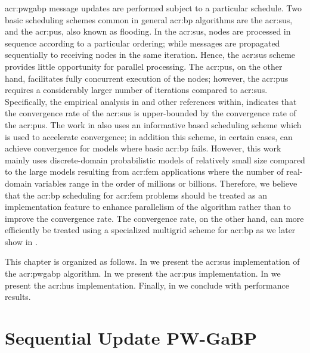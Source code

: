 \gls{acr:pwgabp} message updates are performed subject to a particular schedule.
Two basic scheduling schemes common in general \gls{acr:bp} algorithms are the \gls{acr:sus}, and the \gls{acr:pus}, also known as flooding.  
In the \gls{acr:sus}, nodes are processed in sequence according to a particular ordering; while messages are propagated sequentially to receiving nodes in the same iteration.  
Hence, the \gls{acr:sus} scheme provides little opportunity for parallel processing.
The \gls{acr:pus}, on the other hand, facilitates fully concurrent execution of the nodes; however, the \gls{acr:pus} requires a considerably larger number of iterations compared to \gls{acr:sus}.
Specifically, the empirical analysis in \cite{bib:Elidan06ResidualBP,bib:Bertsekas1983DACFP} and other references within, indicates that the convergence rate of the \gls{acr:sus} is upper-bounded by the convergence rate of the \gls{acr:pus}.
The work in \cite{bib:Elidan06ResidualBP,bib:gonzalez2009residual} also uses an informative based scheduling scheme which is used to accelerate convergence; in addition this scheme, in certain cases, can achieve convergence for models where basic \gls{acr:bp} fails.  
However, this work mainly uses discrete-domain probabilistic models of relatively small size compared to the large models resulting from \gls{acr:fem} applications where the number of real-domain variables range in the order of millions or billions.
Therefore, we believe that the \gls{acr:bp} scheduling for \gls{acr:fem} problems should be treated as an implementation feature to enhance parallelism of the algorithm rather than to improve the convergence rate.
The convergence rate, on the other hand, can more efficiently be treated using a specialized multigrid scheme for \gls{acr:bp} as we later show in .


This chapter is organized as follows.
In  we present the \gls{acr:sus} implementation of the \gls{acr:pwgabp} algorithm. 
In  we present the \gls{acr:pus} implementation.
In  we present the \gls{acr:hus} implementation.
Finally, in  we conclude with performance results.

\section{Sequential Update PW-GaBP}
\label{sec:sus}


